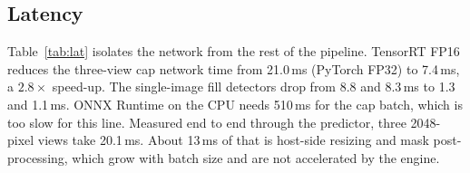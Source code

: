 \documentclass[conference]{IEEEtran}
\begin{document}
\subsection{Latency}
Table~\ref{tab:lat} isolates the network from the rest of the pipeline. TensorRT FP16 reduces the three-view cap network time from 21.0\,ms (PyTorch FP32) to 7.4\,ms, a $2.8\times$ speed-up. The single-image fill detectors drop from 8.8 and 8.3\,ms to 1.3 and 1.1\,ms. ONNX Runtime on the CPU needs 510\,ms for the cap batch, which is too slow for this line. Measured end to end through the predictor, three 2048-pixel views take 20.1\,ms. About 13\,ms of that is host-side resizing and mask post-processing, which grow with batch size and are not accelerated by the engine.

\begin{table}[t]
\caption{Per-call latency (ms, median of 100) inside the production container}
\label{tab:lat}
\centering
\setlength{\tabcolsep}{3pt}
\end{table}
\end{document}
